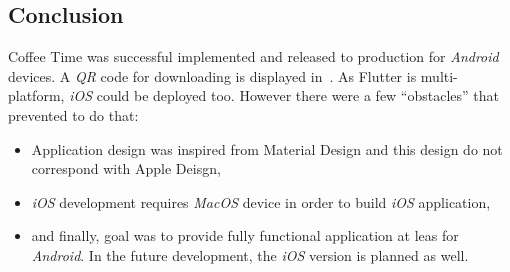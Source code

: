 \subsection{Conclusion}
Coffee Time was successful implemented and released to production for \textit{Android} devices. A \textit{QR} code for downloading is displayed in~. As Flutter is multi-platform, \textit{iOS} could be deployed too. However there were a few ``obstacles'' that prevented to do that:

\begin{itemize}
    \item Application design was inspired from Material Design and this design do not correspond with Apple Deisgn,
    \item \textit{iOS} development requires \textit{MacOS} device in order to build \textit{iOS} application,
    \item and finally, goal was to provide fully functional application at leas for \textit{Android}. In the future development, the \textit{iOS} version is planned as well. 
\end{itemize}